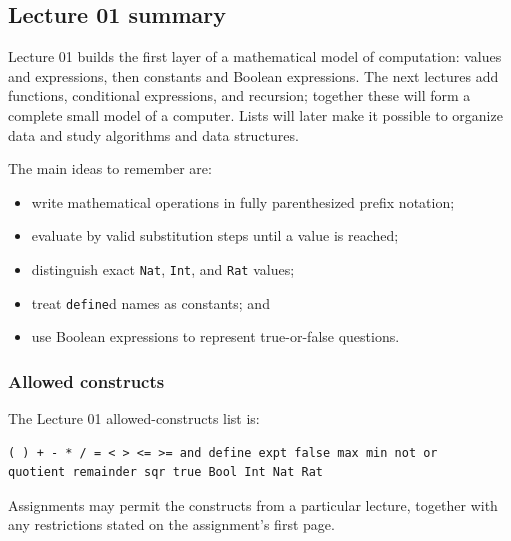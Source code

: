 \subsection{Lecture 01 summary}
Lecture 01 builds the first layer of a mathematical model of computation:
values and expressions, then constants and Boolean expressions.  The next
lectures add functions, conditional expressions, and recursion; together these
will form a complete small model of a computer.  Lists will later make it
possible to organize data and study algorithms and data structures.

The main ideas to remember are:
\begin{itemize}
  \item write mathematical operations in fully parenthesized prefix notation;
  \item evaluate by valid substitution steps until a value is reached;
  \item distinguish exact \texttt{Nat}, \texttt{Int}, and \texttt{Rat} values;
  \item treat \texttt{define}d names as constants; and
  \item use Boolean expressions to represent true-or-false questions.
\end{itemize}

\subsubsection{Allowed constructs}
The Lecture 01 allowed-constructs list is:
\begin{verbatim}
( ) + - * / = < > <= >= and define expt false max min not or
quotient remainder sqr true Bool Int Nat Rat
\end{verbatim}
Assignments may permit the constructs from a particular lecture, together
with any restrictions stated on the assignment's first page.
